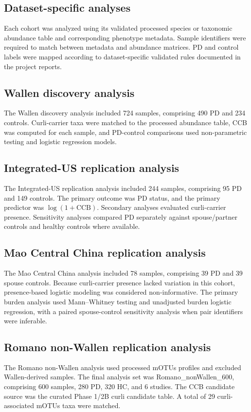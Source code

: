 \documentclass[12pt]{article}
\begin{document}
\subsection*{Dataset-specific analyses}
Each cohort was analyzed using its validated processed species or taxonomic abundance table and corresponding phenotype metadata. Sample identifiers were required to match between metadata and abundance matrices. PD and control labels were mapped according to dataset-specific validated rules documented in the project reports.

\subsection*{Wallen discovery analysis}
The Wallen discovery analysis included 724 samples, comprising 490 PD and 234 controls. Curli-carrier taxa were matched to the processed abundance table, CCB was computed for each sample, and PD-control comparisons used non-parametric testing and logistic regression models.

\subsection*{Integrated-US replication analysis}
The Integrated-US replication analysis included 244 samples, comprising 95 PD and 149 controls. The primary outcome was PD status, and the primary predictor was $\log(1+\mathrm{CCB})$. Secondary analyses evaluated curli-carrier presence. Sensitivity analyses compared PD separately against spouse/partner controls and healthy controls where available.

\subsection*{Mao Central China replication analysis}
The Mao Central China analysis included 78 samples, comprising 39 PD and 39 spouse controls. Because curli-carrier presence lacked variation in this cohort, presence-based logistic modeling was considered non-informative. The primary burden analysis used Mann--Whitney testing and unadjusted burden logistic regression, with a paired spouse-control sensitivity analysis when pair identifiers were inferable.

\subsection*{Romano non-Wallen replication analysis}
The Romano non-Wallen analysis used processed mOTUs profiles and excluded Wallen-derived samples. The final analysis set was Romano\_nonWallen\_600, comprising 600 samples, 280 PD, 320 HC, and 6 studies. The CCB candidate source was the curated Phase 1/2B curli candidate table. A total of 29 curli-associated mOTUs taxa were matched.
\end{document}
